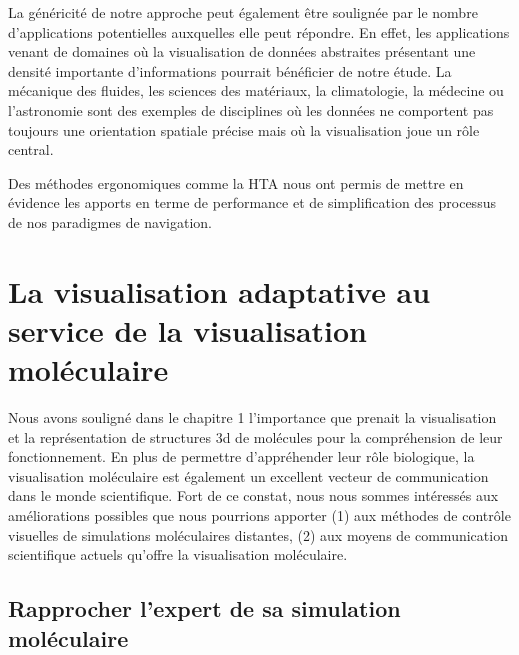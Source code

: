 La généricité de notre approche peut également être soulignée par le nombre d'applications potentielles auxquelles elle peut répondre. En effet, les applications venant de domaines où la visualisation de données abstraites présentant une densité importante d'informations pourrait bénéficier de notre étude.  La mécanique des fluides, les sciences des matériaux, la climatologie, la médecine ou l'astronomie sont des exemples de disciplines où les données ne comportent pas toujours une orientation spatiale précise mais où la visualisation joue un rôle central.

Des méthodes ergonomiques comme la HTA nous ont permis de mettre en évidence les apports en terme de performance et de simplification des processus de nos paradigmes de navigation. 


\section{La visualisation adaptative au service de la visualisation moléculaire}

Nous avons souligné dans le chapitre 1 l'importance que prenait la visualisation et la représentation de structures 3d de molécules pour la compréhension de leur fonctionnement. En plus de permettre d'appréhender leur rôle biologique, la visualisation moléculaire est également un excellent vecteur de communication dans le monde scientifique. Fort de ce constat, nous nous sommes intéressés aux améliorations possibles que nous pourrions apporter (1) aux méthodes de contrôle visuelles de simulations moléculaires distantes, (2) aux moyens de communication scientifique actuels qu'offre la visualisation moléculaire. %


\subsection{Rapprocher l'expert de sa simulation moléculaire}

